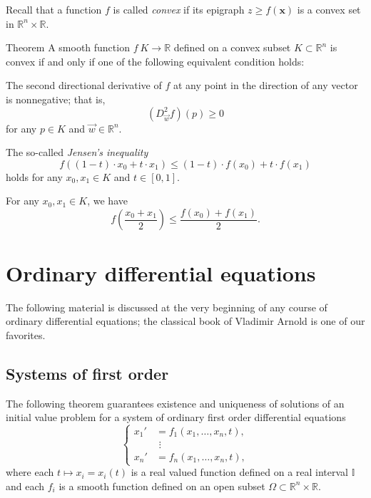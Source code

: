 Recall that a function $f$ is called \emph{convex} if 
its epigraph $z\ge f(\bm{x})$ is a convex set in $\mathbb{R}^n\times \mathbb{R}$.

\begin{thm}{Theorem}
A smooth function $f\:K\to \mathbb{R}$ defined on a convex subset $K\subset\mathbb{R}^n$ is convex if and only if one of the following equivalent condition holds:

\begin{subthm}{}
The second directional derivative of $f$ at any point in the direction of any vector is nonnegative; that is,
\[(D_{\vec w}^2f)(p)\ge 0\]
for any $p\in K$ and $\vec w\in\mathbb{R}^n$.
\end{subthm}

\begin{subthm}{}
The so-called \emph{Jensen's inequality}
\[f \left ((1-t)\cdot x_0 + t\cdot x_1 \right ) \le (1-t)\cdot f(x_0)+ t\cdot f(x_1)\]
holds for any $x_0,x_1\in K$ and $t\in[0,1]$.

\end{subthm}

\begin{subthm}{}
For any $x_0,x_1\in K$, we have 
\[f \left (\frac{x_0 + x_1}2 \right ) \le \frac{f(x_0) + f(x_1)}2.\]
\end{subthm}

\end{thm}




\section{Ordinary differential equations}

The following material is discussed at the very beginning of any course of ordinary differential equations; the classical book of Vladimir Arnold \cite{arnold} is one of our favorites.


\subsection*{Systems of first order}

The following theorem guarantees existence and uniqueness of solutions of an initial value problem
for a system of ordinary first order differential equations
\[
\begin{cases}
x_1'&=f_1(x_1,\dots,x_n,t),
\\
&\,\,\vdots
\\
x_n'&=f_n(x_1,\dots,x_n,t),
\end{cases}
\]
where each $t\mapsto x_i=x_i(t)$ is a real valued function defined on a real interval $\mathbb{I}$
and each $f_i$ is a smooth function defined on an open subset $\Omega\subset \mathbb{R}^n\times \mathbb{R}$.

